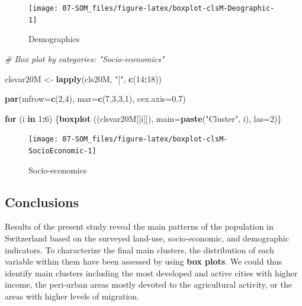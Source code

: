 \documentclass[
]{article}
\newenvironment{Shaded}{\begin{snugshade}}{\end{snugshade}}
\newcommand{\AttributeTok}[1]{\textcolor[rgb]{0.13,0.29,0.53}{#1}}
\newcommand{\CommentTok}[1]{\textcolor[rgb]{0.56,0.35,0.01}{\textit{#1}}}
\newcommand{\ControlFlowTok}[1]{\textcolor[rgb]{0.13,0.29,0.53}{\textbf{#1}}}
\newcommand{\DecValTok}[1]{\textcolor[rgb]{0.00,0.00,0.81}{#1}}
\newcommand{\FloatTok}[1]{\textcolor[rgb]{0.00,0.00,0.81}{#1}}
\newcommand{\FunctionTok}[1]{\textcolor[rgb]{0.13,0.29,0.53}{\textbf{#1}}}
\newcommand{\NormalTok}[1]{#1}
\newcommand{\OtherTok}[1]{\textcolor[rgb]{0.56,0.35,0.01}{#1}}
\newcommand{\SpecialCharTok}[1]{\textcolor[rgb]{0.81,0.36,0.00}{\textbf{#1}}}
\newcommand{\StringTok}[1]{\textcolor[rgb]{0.31,0.60,0.02}{#1}}
\begin{document}
\begin{figure}

{\centering \texttt{[image: 07-SOM\_files/figure-latex/boxplot-clsM-Deographic-1]} 

}

\caption{Demographics}\label{fig:boxplot-clsM-Deographic}
\end{figure}

\begin{Shaded}
\begin{Highlighting}[]
\CommentTok{\# Box plot by categories: "Socio{-}economics"}

\NormalTok{clsvar20M }\OtherTok{\textless{}{-}} \FunctionTok{lapply}\NormalTok{(cls20M, }\StringTok{"["}\NormalTok{, }\FunctionTok{c}\NormalTok{(}\DecValTok{14}\SpecialCharTok{:}\DecValTok{18}\NormalTok{)) }

\FunctionTok{par}\NormalTok{(}\AttributeTok{mfrow=}\FunctionTok{c}\NormalTok{(}\DecValTok{2}\NormalTok{,}\DecValTok{4}\NormalTok{), }\AttributeTok{mar=}\FunctionTok{c}\NormalTok{(}\DecValTok{7}\NormalTok{,}\DecValTok{3}\NormalTok{,}\DecValTok{3}\NormalTok{,}\DecValTok{1}\NormalTok{), }\AttributeTok{cex.axis=}\FloatTok{0.7}\NormalTok{)}

\ControlFlowTok{for}\NormalTok{ (i }\ControlFlowTok{in} \DecValTok{1}\SpecialCharTok{:}\DecValTok{6}\NormalTok{) \{}\FunctionTok{boxplot}\NormalTok{ ((clsvar20M[[i]]), }\AttributeTok{main=}\FunctionTok{paste}\NormalTok{(}\StringTok{"Cluster"}\NormalTok{, i),  }\AttributeTok{las=}\DecValTok{2}\NormalTok{)\}}
\end{Highlighting}
\end{Shaded}

\begin{figure}

{\centering \texttt{[image: 07-SOM\_files/figure-latex/boxplot-clsM-SocioEconomic-1]} 

}

\caption{Socio-economics}\label{fig:boxplot-clsM-SocioEconomic}
\end{figure}

\subsection{Conclusions}\label{conclusions}

Results of the present study reveal the main patterns of the population in Switzerland based on the surveyed land-use, socio-economic, and demographic indicators.
To characterize the final main clusters, the distribution of each variable within them have been assessed by using \textbf{box plots}.
We could thus identify main clusters including the most developed and active cities with higher income, the peri-urban areas mostly devoted to the agricultural activity, or the areas with higher levels of migration.
\end{document}
